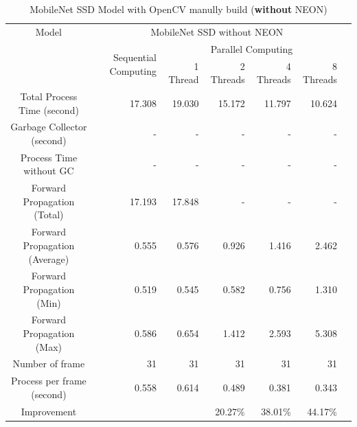             \begin{table}[!htp]\centering
                \scriptsize
                \begin{tabular}{lrrrrrrr}\toprule
                    \multicolumn{2}{c}{Model} &\multicolumn{5}{c}{MobileNet SSD without NEON} \\\cmidrule{1-7}
                    \multicolumn{2}{c}{\multirow{2}{*}{}} &\multirow{2}{*}{Sequential Computing} &\multicolumn{4}{c}{Parallel Computing} \\\cmidrule{4-7}
                    & & &1 Thread &2 Threads &4 Threads &8 Threads \\\midrule
                    \multicolumn{2}{c}{Total Process Time (second)} &17.308 &19.030 &15.172 &11.797 &10.624 \\
                    \multicolumn{2}{c}{Garbage Collector (second)} &- &- &- &- &- \\
                    \multicolumn{2}{c}{Process Time without GC} &- &- &- &- &- \\
                    \multicolumn{2}{c}{Forward Propagation (Total)} &17.193 &17.848 &- &- &- \\
                    \multicolumn{2}{c}{Forward Propagation (Average)} &0.555 &0.576 &0.926 &1.416 &2.462 \\
                    \multicolumn{2}{c}{Forward Propagation (Min)} &0.519 &0.545 &0.582 &0.756 &1.310 \\
                    \multicolumn{2}{c}{Forward Propagation (Max)} &0.586 &0.654 &1.412 &2.593 &5.308 \\
                    \multicolumn{2}{c}{Number of frame} &31 &31 &31 &31 &31 \\
                    \multicolumn{2}{c}{Process per frame (second)} &0.558 &0.614 &0.489 &0.381 &0.343 \\
                    \multicolumn{2}{c}{Improvement} & & &20.27\% &38.01\% &44.17\% \\
                    \bottomrule
                \end{tabular}

                \caption{MobileNet SSD Model with OpenCV manully build ({\bf without} NEON)}\label{ssd:non-neon-performance}
            \end{table}

